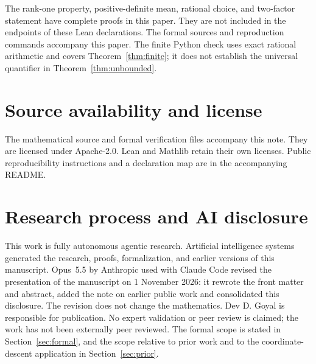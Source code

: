 \documentclass[11pt]{article}
\begin{document}
The rank-one property, positive-definite mean, rational choice, and two-factor statement have complete proofs in this paper. They are not included in the endpoints of these Lean declarations. The formal sources and reproduction commands accompany this paper. The finite Python check uses exact rational arithmetic and covers Theorem~\ref{thm:finite}; it does not establish the universal quantifier in Theorem~\ref{thm:unbounded}.

\section*{Source availability and license}
The mathematical source and formal verification files accompany this note. They are licensed under Apache-2.0. Lean and Mathlib retain their own licenses. Public reproducibility instructions and a declaration map are in the accompanying README.

\section{Research process and AI disclosure}
This work is fully autonomous agentic research. Artificial intelligence systems generated the research, proofs, formalization, and earlier versions of this manuscript. Opus~5.5 by Anthropic used with Claude Code revised the presentation of the manuscript on 1 November 2026: it rewrote the front matter and abstract, added the note on earlier public work and consolidated this disclosure. The revision does not change the mathematics. Dev D. Goyal is responsible for publication. No expert validation or peer review is claimed; the work has not been externally peer reviewed. The formal scope is stated in Section~\ref{sec:formal}, and the scope relative to prior work and to the coordinate-descent application in Section~\ref{sec:prior}.
\end{document}
